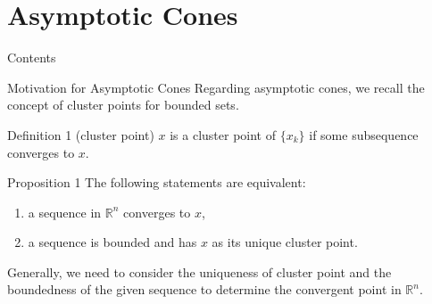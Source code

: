 \documentclass[aspectratio=169, dvipdfmx, 11pt]{beamer} %
\newcommand{\NDemenstionalRealEuclideanSpace}{\mathbb{R}^n}
\begin{document}
\section{Asymptotic Cones}
\begin{frame}{Contents}
    \tableofcontents[currentsection]
\end{frame}

\begin{frame}{Motivation for Asymptotic Cones}
    Regarding asymptotic cones, we recall the concept of cluster points for bounded sets.

    \begin{block}{Definition 1 (cluster point)}
    $x$ is a cluster point of $\{ x_k \}$ if some subsequence converges to $x$.
    \end{block}

    \begin{block}{Proposition 1}
    The following statements are equivalent:

    \begin{enumerate}[i]
        \item a sequence in $\NDemenstionalRealEuclideanSpace$ converges to $x$,
        \item a sequence is bounded and has $x$ as its unique cluster point.
    \end{enumerate}
    \end{block}

    Generally, we need to consider the uniqueness of cluster point and the boundedness of the given sequence to determine the convergent point in $\NDemenstionalRealEuclideanSpace$.
\end{frame}
\end{document}
